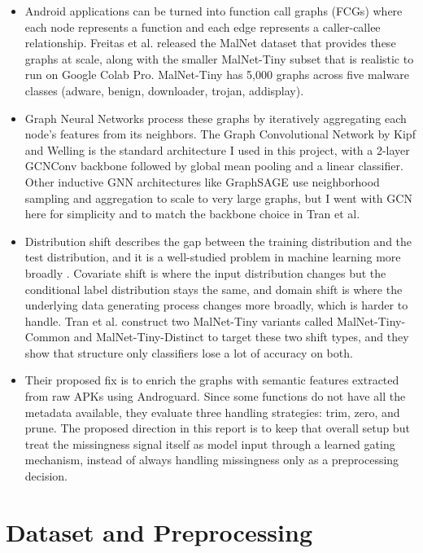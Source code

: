 \documentclass[12pt]{article}
\begin{document}
\begin{itemize}
    \item Android applications can be turned into function call graphs (FCGs) where each node represents a function and each edge represents a caller-callee relationship. Freitas et al. \cite{freitas2020malnet} released the MalNet dataset that provides these graphs at scale, along with the smaller MalNet-Tiny subset that is realistic to run on Google Colab Pro. MalNet-Tiny has 5,000 graphs across five malware classes (adware, benign, downloader, trojan, addisplay).
    \item Graph Neural Networks process these graphs by iteratively aggregating each node's features from its neighbors. The Graph Convolutional Network by Kipf and Welling \cite{kipf2017gcn} is the standard architecture I used in this project, with a 2-layer GCNConv backbone followed by global mean pooling and a linear classifier. Other inductive GNN architectures like GraphSAGE \cite{hamilton2017graphsage} use neighborhood sampling and aggregation to scale to very large graphs, but I went with GCN here for simplicity and to match the backbone choice in Tran et al.
    \item Distribution shift describes the gap between the training distribution and the test distribution, and it is a well-studied problem in machine learning more broadly \cite{quinonero2009datasetshift}. Covariate shift is where the input distribution changes but the conditional label distribution stays the same, and domain shift is where the underlying data generating process changes more broadly, which is harder to handle. Tran et al. \cite{tran2025} construct two MalNet-Tiny variants called MalNet-Tiny-Common and MalNet-Tiny-Distinct to target these two shift types, and they show that structure only classifiers lose a lot of accuracy on both.
    \item Their proposed fix is to enrich the graphs with semantic features extracted from raw APKs using Androguard. Since some functions do not have all the metadata available, they evaluate three handling strategies: trim, zero, and prune. The proposed direction in this report is to keep that overall setup but treat the missingness signal itself as model input through a learned gating mechanism, instead of always handling missingness only as a preprocessing decision.
\end{itemize}

\section{Dataset and Preprocessing}
\end{document}
